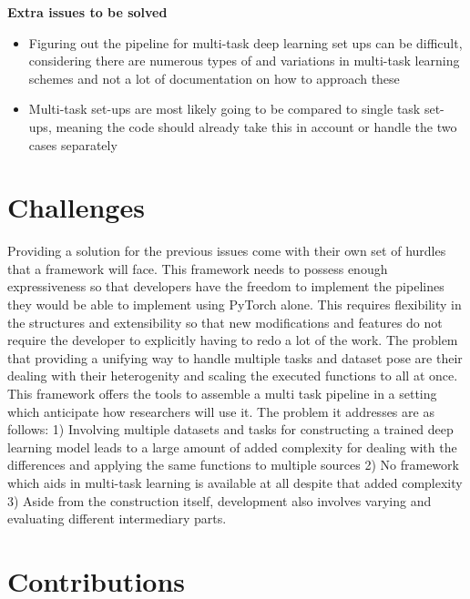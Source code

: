 \textbf{Extra issues to be solved}
\begin{itemize}
	\item Figuring out the pipeline for multi-task deep learning set ups can be difficult, considering there are numerous types of and variations in multi-task learning schemes and not a lot of documentation on how to approach these
	\item Multi-task set-ups are most likely going to be compared to single task set-ups, meaning the code should already take this in account or handle the two cases separately
\end{itemize}

\section{Challenges}

Providing a solution for the previous issues come with their own set of hurdles that a framework will face. This framework needs to possess enough expressiveness so that developers have the freedom to implement the pipelines they would be able to implement using PyTorch alone. This requires flexibility in the structures and extensibility so that new modifications and features do not require the developer to explicitly having to redo a lot of the work. The problem that providing a unifying way to handle multiple tasks and dataset pose are their dealing with their heterogenity and scaling the executed functions to all at once.\\

This framework offers the tools to assemble a multi task pipeline in a setting which anticipate how researchers will use it. The problem it addresses are as follows: 1) Involving multiple datasets and tasks for constructing a trained deep learning model leads to a large amount of added complexity for dealing with the differences and applying the same functions to multiple sources 2) No framework which aids in multi-task learning is available at all despite that added complexity 3) Aside from the construction itself, development also involves varying and evaluating different intermediary parts. 



\section{Contributions}

